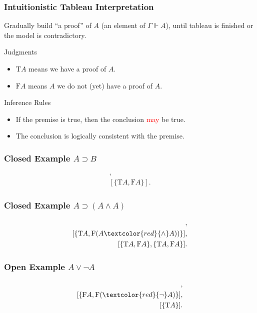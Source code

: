\documentclass[mathserif]{beamer}
\def\T{\textrm{T}}
\def\F{\textrm{F}}
\def\imp{\supset}
\newcommand{\diff}[1]{\textcolor{red}{#1}}
\newcommand{\force}[1]{\Gamma \Vdash #1}
\begin{document}
\begin{frame}
\frametitle{Intuitionistic Tableau Interpretation}

Gradually build ``a proof'' of $A$ (an element of $\force{A}$),
until tableau is finished or the model is contradictory.

\begin{block}{Judgments}
\begin{itemize}
\item $\T A$ means we have a proof of $A$.
\item $\F A$ means $A$ we do not (yet) have a proof of $A$.
\end{itemize}
\end{block}

\begin{block}{Inference Rules}
\begin{itemize}
\item If the premise is true, then the conclusion \diff{may} be true.
\item The conclusion is logically consistent with the premise.
\end{itemize}
\end{block}

\end{frame}


\begin{frame}
\frametitle{Closed Example $A \imp B$}

\begin{align*}
[\{ \F(A \diff{\imp} B) \}],\\
[\{ \T A, \F A \}].
\end{align*}

\end{frame}

\begin{frame}
\frametitle{Closed Example $A \imp (A \land A)$}

\begin{align*}
[\{ \F(A \diff{\imp} (A \land A)) \}],\\
[\{ \T A, \F(A \diff{\land} A)) \}],\\
[\{ \T A, \F A \}, \{ \T A, \F A \}].
\end{align*}

\end{frame}

\begin{frame}
\frametitle{Open Example $A \lor \neg A$}

\begin{align*}
[\{ \F(A \diff{\lor} \neg A) \}],\\
[\{ \F A, \F(\diff{\neg} A) \}],\\
[\{ \T A \}].
\end{align*}

\end{frame}
\end{document}
